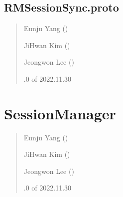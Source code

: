 \documentclass[a4paper,10pt,english]{sphinxmanual}
\begin{document}
\section{RMSessionSync.proto}
\label{\detokenize{_RMSessionSyncProto:rmsessionsync-proto}}\label{\detokenize{_RMSessionSyncProto:rmsessionsyncproto}}\label{\detokenize{_RMSessionSyncProto::doc}}\begin{quote}\begin{description}
\begin{DUlineblock}{0em}
\item[] Eunju Yang ()
\item[] JiHwan Kim ()
\item[] Jeongwon Lee ()
\end{DUlineblock}

.0 of 2022.11.30

\end{description}\end{quote}

\sphinxstepscope


\chapter{SessionManager}
\label{\detokenize{SessionManager:sessionmanager}}\label{\detokenize{SessionManager:sessionmanagermodule}}\label{\detokenize{SessionManager::doc}}\begin{quote}\begin{description}
\begin{DUlineblock}{0em}
\item[] Eunju Yang ()
\item[] Ji\sphinxhyphen{}Hwan Kim ()
\item[] Jeongwon Lee ()
\end{DUlineblock}

.0 of 2022.11.30

\end{description}\end{quote}
\end{document}

